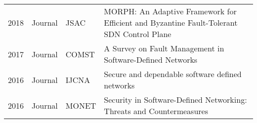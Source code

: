 \begin{appendices}
\begin{table}[ht!]
\begin{adjustbox}{width=\linewidth, center}
\begin{tabular}{llll}
2018          & Journal             & JSAC                         & MORPH: An Adaptive Framework for Efficient and Byzantine Fault-Tolerant SDN Control Plane\citep{8490892}                                                                       \\
2017          & Journal             & COMST                        & A Survey on Fault Management in Software-Defined Networks\citep{7959044}                                                                                                       \\
2016          & Journal             & IJCNA                        & Secure and dependable software defined networks\citep{AKHUNZADA2016199}                                                                                                        \\
2016          & Journal             & MONET                        & Security in Software-Defined Networking: Threats and Countermeasures\citep{Shu2016}                                                                                            \\

\bottomrule

\end{tabular}
\end{adjustbox}
\end{table}
\end{appendices}

